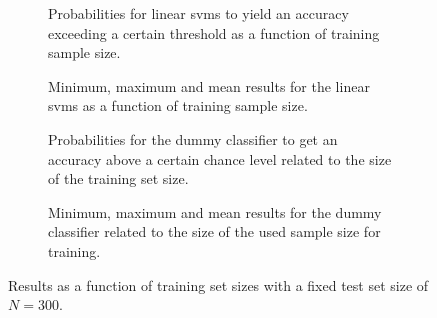 \documentclass[12pt,a4paper]{article}
\begin{document}
    \begin{figure}
        \captionsetup[subfigure]{justification=justified,singlelinecheck=false}
        \begin{subfigure}[t]{0.61\textwidth}
            
            \caption{Probabilities for linear \acp{svm} to yield an accuracy exceeding a certain threshold as a function of training sample size. }
        \end{subfigure}
        \hspace{3.0mm}
        \begin{subfigure}[t]{0.34\textwidth}
            
            \caption{Minimum, maximum and mean results for the linear \acp{svm} as a function of training sample size. }
        \end{subfigure}

        \vspace{3.0mm}

        \begin{subfigure}[t]{0.61\textwidth}
            
            \caption{Probabilities for the dummy classifier to get an accuracy above a certain chance level related to the size of the training set size.}
        \end{subfigure}
        \hspace{3.0mm}
        \begin{subfigure}[t]{0.34\textwidth}
            
            \caption{Minimum, maximum and mean results for the dummy classifier related to the size of the used sample size for training.}
        \end{subfigure}
        \caption{Results as a function of training set sizes with a fixed test set size of $N = \num{300}$.}
        \label{fig:train_sample_size_effects}
    \end{figure}
\end{document}
